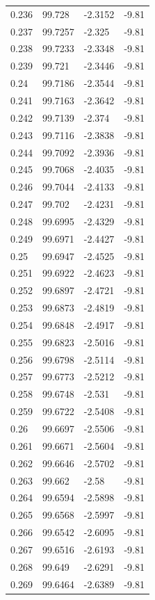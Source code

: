 \begin{tabular}{llll}
0.236 & 99.728 & -2.3152 & -9.81 \\
0.237 & 99.7257 & -2.325 & -9.81 \\
0.238 & 99.7233 & -2.3348 & -9.81 \\
0.239 & 99.721 & -2.3446 & -9.81 \\
0.24 & 99.7186 & -2.3544 & -9.81 \\
0.241 & 99.7163 & -2.3642 & -9.81 \\
0.242 & 99.7139 & -2.374 & -9.81 \\
0.243 & 99.7116 & -2.3838 & -9.81 \\
0.244 & 99.7092 & -2.3936 & -9.81 \\
0.245 & 99.7068 & -2.4035 & -9.81 \\
0.246 & 99.7044 & -2.4133 & -9.81 \\
0.247 & 99.702 & -2.4231 & -9.81 \\
0.248 & 99.6995 & -2.4329 & -9.81 \\
0.249 & 99.6971 & -2.4427 & -9.81 \\
0.25 & 99.6947 & -2.4525 & -9.81 \\
0.251 & 99.6922 & -2.4623 & -9.81 \\
0.252 & 99.6897 & -2.4721 & -9.81 \\
0.253 & 99.6873 & -2.4819 & -9.81 \\
0.254 & 99.6848 & -2.4917 & -9.81 \\
0.255 & 99.6823 & -2.5016 & -9.81 \\
0.256 & 99.6798 & -2.5114 & -9.81 \\
0.257 & 99.6773 & -2.5212 & -9.81 \\
0.258 & 99.6748 & -2.531 & -9.81 \\
0.259 & 99.6722 & -2.5408 & -9.81 \\
0.26 & 99.6697 & -2.5506 & -9.81 \\
0.261 & 99.6671 & -2.5604 & -9.81 \\
0.262 & 99.6646 & -2.5702 & -9.81 \\
0.263 & 99.662 & -2.58 & -9.81 \\
0.264 & 99.6594 & -2.5898 & -9.81 \\
0.265 & 99.6568 & -2.5997 & -9.81 \\
0.266 & 99.6542 & -2.6095 & -9.81 \\
0.267 & 99.6516 & -2.6193 & -9.81 \\
0.268 & 99.649 & -2.6291 & -9.81 \\
0.269 & 99.6464 & -2.6389 & -9.81 \\

\end{tabular}

